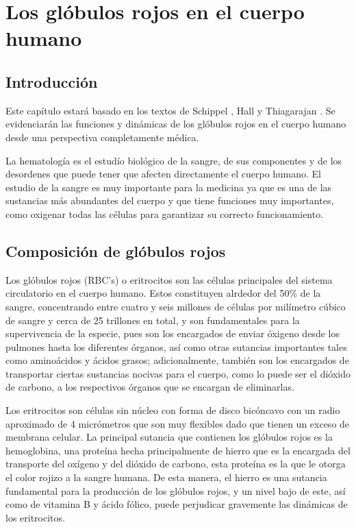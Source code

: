 \chapter{Los glóbulos rojos en el cuerpo humano}\label{chap:RBC}
\section{Introducción}\label{sec:RBC:intro}
Este capítulo estará basado en los textos de Schippel \cite{schippel2023dynamics}, Hall \cite{hall2021guyton} y Thiagarajan \cite{thiagarajan2021red}. Se evidenciarán las funciones y dinámicas de los glóbulos rojos en el cuerpo humano desde una perspectiva completamente médica.

La hematología es el estudío biológico de la sangre, de sus componentes y de los desordenes que puede tener que afecten directamente el cuerpo humano. El estudio de la sangre es muy importante para la medicina ya que es una de las sustancias más abundantes del cuerpo y que tiene funciones muy importantes, como oxigenar todas las células para garantizar su correcto funcionamiento.

\section{Composición de glóbulos rojos}\label{sec:RBC:Composicion}
Los glóbulos rojos (RBC's) o eritrocitos son las células principales del sistema circulatorio en el cuerpo humano. Estos constituyen alrdedor del 50\% de la sangre, concentrando entre cuatro y seis millones de células por milímetro cúbico de sangre y cerca de 25 trillones en total, y son fundamentales para la supervivencia de la especie, pues son los encargados de enviar óxigeno desde los pulmones hasta los diferentes órganos, así como otras sutancias importantes tales como aminoácidos y ácidos grasos; adicionalmente, también son los encargados de transportar ciertas sustancias nocivas para el cuerpo, como lo puede ser el dióxido de carbono, a los respectivos órganos que se encargan de eliminarlas.

Los eritrocitos son células sin núcleo con forma de disco bicóncavo con un radio aproximado de 4 micrómetros que son muy flexibles dado que tienen un exceso de membrana celular. La principal sutancia que contienen los glóbulos rojos es la hemoglobina, una proteína hecha principalmente de hierro que es la encargada del transporte del oxígeno y del dióxido de carbono, esta proteína es la que le otorga el color rojizo a la sangre humana. De esta manera, el hierro es una sutancia fundamental para la producción de los glóbulos rojos, y un nivel bajo de este, así como de vitamina B y ácido fólico, puede perjudicar gravemente las dinámicas de los eritrocitos.

